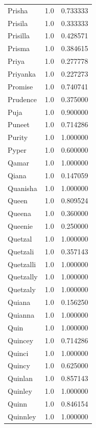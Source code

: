 \documentclass[
  letterpaper,
  DIV=11,
  numbers=noendperiod]{scrreprt}
\begin{document}
\begin{tabular}{lrr}
Prisha          &   1.0 &   0.733333 \\
Prisila         &   1.0 &   0.333333 \\
Prisilla        &   1.0 &   0.428571 \\
Prisma          &   1.0 &   0.384615 \\
Priya           &   1.0 &   0.277778 \\
Priyanka        &   1.0 &   0.227273 \\
Promise         &   1.0 &   0.740741 \\
Prudence        &   1.0 &   0.375000 \\
Puja            &   1.0 &   0.900000 \\
Puneet          &   1.0 &   0.714286 \\
Purity          &   1.0 &   1.000000 \\
Pyper           &   1.0 &   0.600000 \\
Qamar           &   1.0 &   1.000000 \\
Qiana           &   1.0 &   0.147059 \\
Quanisha        &   1.0 &   1.000000 \\
Queen           &   1.0 &   0.809524 \\
Queena          &   1.0 &   0.360000 \\
Queenie         &   1.0 &   0.250000 \\
Quetzal         &   1.0 &   1.000000 \\
Quetzali        &   1.0 &   0.357143 \\
Quetzalli       &   1.0 &   1.000000 \\
Quetzally       &   1.0 &   1.000000 \\
Quetzaly        &   1.0 &   1.000000 \\
Quiana          &   1.0 &   0.156250 \\
Quianna         &   1.0 &   1.000000 \\
Quin            &   1.0 &   1.000000 \\
Quincey         &   1.0 &   0.714286 \\
Quinci          &   1.0 &   1.000000 \\
Quincy          &   1.0 &   0.625000 \\
Quinlan         &   1.0 &   0.857143 \\
Quinley         &   1.0 &   1.000000 \\
Quinn           &   1.0 &   0.846154 \\
Quinnley        &   1.0 &   1.000000 \\

\end{tabular}
\end{document}
